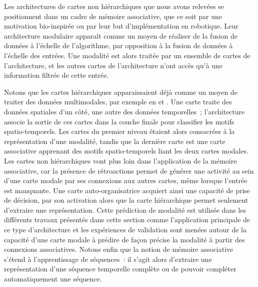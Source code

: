 \documentclass[../main]{subfiles}
\begin{document}
Les architectures de cartes non hiérarchiques que nous avons relevées se positionnent dans un cadre de mémoire associative, que ce soit par une motivation bio-inspirée ou par leur but d'implémentation en robotique.
Leur architecture modulaire apparaît comme un moyen de réaliser de la fusion de données à l'échelle de l'algorithme, par opposition à la fusion de données à l'échelle des entrées. 
Une modalité est alors traitée par un ensemble de cartes de l'architecture, et les autres cartes de l'architecture n'ont accès qu'à une information filtrée de cette entrée. 


Notons que les cartes hiérarchiques apparaissaient déjà comme un moyen de traiter des données multimodales, par exemple en \cite{mici_self-organizing_2018} et \cite{nawaratne_hierarchical_2020-1}. 
Une carte traite des données spatiales d'un côté, une autre des données temporelles~; l'architecture associe la sortie de ces cartes dans la couche finale pour classifier les motifs spatio-temporels. Les cartes du premier niveau étaient alors consacrées à la représentation d'une modalité, tandis que la dernière carte est une carte associative apprenant des motifs spatio-temporels liant les deux cartes modales.
Les cartes non hiérarchiques vont plus loin dans l'application de la mémoire associative, car la présence de rétroactions permet de générer une activité au sein d'une carte modale par ses connexions aux autres cartes, même lorsque l'entrée est manquante. Une carte auto-organisatrice acquiert ainsi une capacité de prise de décision, par son activation alors que la carte hiérarchique permet seulement d'extraire une représentation.
Cette prédiction de modalité est utilisée dans les différents travaux présentés dans cette section comme l'application principale de ce type d'architecture et les expériences de validation sont menées autour de la capacité d'une carte modale à prédire de façon précise la modalité à partir des connexions associatives.
Notons enfin que la notion de mémoire associative s'étend à l'apprentissage de séquences~: il s'agit alors d'extraire une représentation d'une séquence temporelle complète ou de pouvoir compléter automatiquement une séquence.
\end{document}
